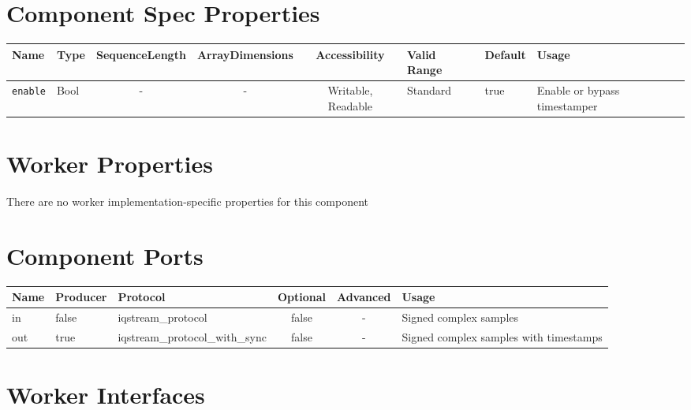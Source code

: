 \documentclass{article}
\begin{document}
\begin{landscape}
	\section*{Component Spec Properties}
	\begin{scriptsize}
		\begin{tabular}{|p{3cm}|p{1.5cm}|c|c|c|p{1.5cm}|p{1cm}|p{7cm}|}
			\hline
			\rowcolor{blue}
			Name          & Type & SequenceLength & ArrayDimensions & Accessibility      & Valid Range & Default & Usage                        \\
			\hline
			\verb+enable+ & Bool & -              & -               & Writable, Readable & Standard    & true    & Enable or bypass timestamper \\
			\hline
		\end{tabular}
	\end{scriptsize}

	\section*{Worker Properties}
	There are no worker implementation-specific properties for this component

	\section*{Component Ports}
	\begin{scriptsize}
		\begin{tabular}{|M{2cm}|M{1.5cm}|M{4cm}|c|c|M{9cm}|}
			\hline
			\rowcolor{blue}
			Name & Producer & Protocol                       & Optional & Advanced & Usage                                  \\
			\hline
			in   & false    & iqstream\_protocol             & false    & -        & Signed complex samples                 \\
			\hline
			out  & true     & iqstream\_protocol\_with\_sync & false    & -        & Signed complex samples with timestamps \\
			\hline
		\end{tabular}
	\end{scriptsize}
	\section*{Worker Interfaces}

\end{landscape}
\end{document}
